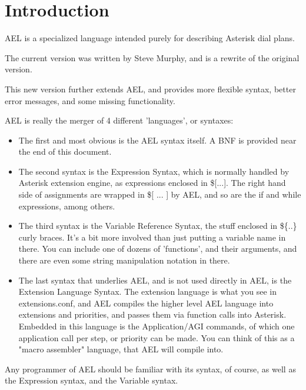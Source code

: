 \section{Introduction}

AEL is a specialized language intended purely for
describing Asterisk dial plans.

The current version was written by Steve Murphy, and is a rewrite of
the original version.

This new version further extends AEL, and
provides more flexible syntax, better error messages, and some missing
functionality.

AEL is really the merger of 4 different 'languages', or syntaxes:

\begin{itemize}
    \item The first and most obvious is the AEL syntax itself. A BNF is
      provided near the end of this document.

    \item The second syntax is the Expression Syntax, which is normally
     handled by Asterisk extension engine, as expressions enclosed in
     \$[...]. The right hand side of assignments are wrapped in \$[ ... ]
     by AEL, and so are the if and while expressions, among others.

    \item The third syntax is the Variable Reference Syntax, the stuff
      enclosed in \$\{..\} curly braces. It's a bit more involved than just
      putting a variable name in there. You can include one of dozens of
      'functions', and their arguments, and there are even some string
      manipulation notation in there.

    \item The last syntax that underlies AEL, and is not used
      directly in AEL, is the Extension Language Syntax. The
      extension language is what you see in extensions.conf, and AEL
      compiles the higher level AEL language into extensions and
      priorities, and passes them via function calls into
      Asterisk. Embedded in this language is the Application/AGI
      commands, of which one application call per step, or priority
      can be made. You can think of this as a "macro assembler"
      language, that AEL will compile into.
\end{itemize}

Any programmer of AEL should be familiar with its syntax, of course,
as well as the Expression syntax, and the Variable syntax.


